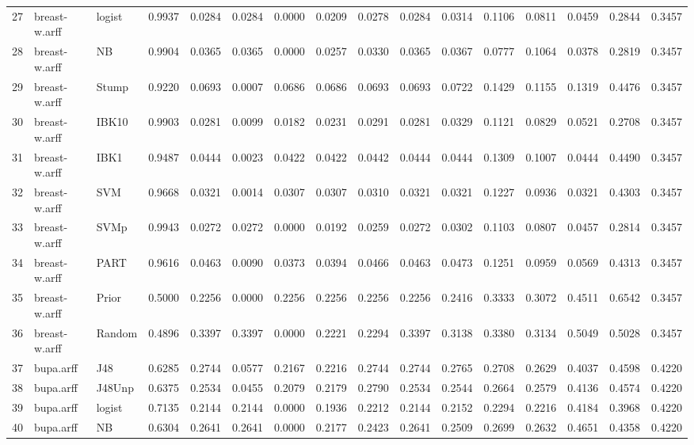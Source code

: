 \documentclass {article}
\begin{document}
\begin{table}[ht]
\begin{tabular}{rllrrrrrrrrrrrrr}
  27 & breast-w.arff & logist & 0.9937 & 0.0284 & 0.0284 & 0.0000 & 0.0209 & 0.0278 & 0.0284 & 0.0314 & 0.1106 & 0.0811 & 0.0459 & 0.2844 & 0.3457 \\ 
  28 & breast-w.arff & NB & 0.9904 & 0.0365 & 0.0365 & 0.0000 & 0.0257 & 0.0330 & 0.0365 & 0.0367 & 0.0777 & 0.1064 & 0.0378 & 0.2819 & 0.3457 \\ 
  29 & breast-w.arff & Stump & 0.9220 & 0.0693 & 0.0007 & 0.0686 & 0.0686 & 0.0693 & 0.0693 & 0.0722 & 0.1429 & 0.1155 & 0.1319 & 0.4476 & 0.3457 \\ 
  30 & breast-w.arff & IBK10 & 0.9903 & 0.0281 & 0.0099 & 0.0182 & 0.0231 & 0.0291 & 0.0281 & 0.0329 & 0.1121 & 0.0829 & 0.0521 & 0.2708 & 0.3457 \\ 
  31 & breast-w.arff & IBK1 & 0.9487 & 0.0444 & 0.0023 & 0.0422 & 0.0422 & 0.0442 & 0.0444 & 0.0444 & 0.1309 & 0.1007 & 0.0444 & 0.4490 & 0.3457 \\ 
  32 & breast-w.arff & SVM & 0.9668 & 0.0321 & 0.0014 & 0.0307 & 0.0307 & 0.0310 & 0.0321 & 0.0321 & 0.1227 & 0.0936 & 0.0321 & 0.4303 & 0.3457 \\ 
  33 & breast-w.arff & SVMp & 0.9943 & 0.0272 & 0.0272 & 0.0000 & 0.0192 & 0.0259 & 0.0272 & 0.0302 & 0.1103 & 0.0807 & 0.0457 & 0.2814 & 0.3457 \\ 
  34 & breast-w.arff & PART & 0.9616 & 0.0463 & 0.0090 & 0.0373 & 0.0394 & 0.0466 & 0.0463 & 0.0473 & 0.1251 & 0.0959 & 0.0569 & 0.4313 & 0.3457 \\ 
  35 & breast-w.arff & Prior & 0.5000 & 0.2256 & 0.0000 & 0.2256 & 0.2256 & 0.2256 & 0.2256 & 0.2416 & 0.3333 & 0.3072 & 0.4511 & 0.6542 & 0.3457 \\ 
  36 & breast-w.arff & Random & 0.4896 & 0.3397 & 0.3397 & 0.0000 & 0.2221 & 0.2294 & 0.3397 & 0.3138 & 0.3380 & 0.3134 & 0.5049 & 0.5028 & 0.3457 \\ 
  37 & bupa.arff & J48 & 0.6285 & 0.2744 & 0.0577 & 0.2167 & 0.2216 & 0.2744 & 0.2744 & 0.2765 & 0.2708 & 0.2629 & 0.4037 & 0.4598 & 0.4220 \\ 
  38 & bupa.arff & J48Unp & 0.6375 & 0.2534 & 0.0455 & 0.2079 & 0.2179 & 0.2790 & 0.2534 & 0.2544 & 0.2664 & 0.2579 & 0.4136 & 0.4574 & 0.4220 \\ 
  39 & bupa.arff & logist & 0.7135 & 0.2144 & 0.2144 & 0.0000 & 0.1936 & 0.2212 & 0.2144 & 0.2152 & 0.2294 & 0.2216 & 0.4184 & 0.3968 & 0.4220 \\ 
  40 & bupa.arff & NB & 0.6304 & 0.2641 & 0.2641 & 0.0000 & 0.2177 & 0.2423 & 0.2641 & 0.2509 & 0.2699 & 0.2632 & 0.4651 & 0.4358 & 0.4220 \\ 

\end{tabular}
\end{table}
\end{document}
